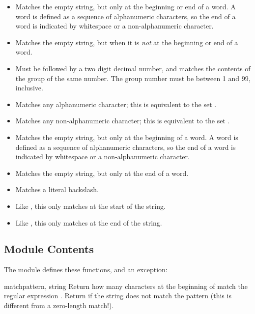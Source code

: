 \begin{itemize}
\item[\code{\e \e b}] Matches the empty string, but only at the
beginning or end of a word.  A word is defined as a sequence of
alphanumeric characters, so the end of a word is indicated by
whitespace or a non-alphanumeric character.
%
\item[\code{\e B}] Matches the empty string, but when it is \emph{not} at the
beginning or end of a word.
%
\item[\code{\e v}] Must be followed by a two digit decimal number, and
matches the contents of the group of the same number.  The group
number must be between 1 and 99, inclusive.
%
\item[\code{\e w}]Matches any alphanumeric character; this is
equivalent to the set \code{[a-zA-Z0-9]}.
%
\item[\code{\e W}] Matches any non-alphanumeric character; this is
equivalent to the set \code{[\^a-zA-Z0-9]}.
\item[\code{\e <}] Matches the empty string, but only at the beginning of a
word.  A word is defined as a sequence of alphanumeric characters, so
the end of a word is indicated by whitespace or a non-alphanumeric 
character.
\item[\code{\e >}] Matches the empty string, but only at the end of a
word.

\item[\code{\e \e \e \e}] Matches a literal backslash.

\item[\code{\e `}] Like \code{\^}, this only matches at the start of the
string.
\item[\code{\e \e '}] Like \code{\$}, this only matches at the end of
the string.
\end{itemize}

\subsection{Module Contents}

The module defines these functions, and an exception:


\begin{funcdesc}{match}{pattern, string}
  Return how many characters at the beginning of  match
  the regular expression .  Return  if the
  string does not match the pattern (this is different from a
  zero-length match!).
\end{funcdesc}

